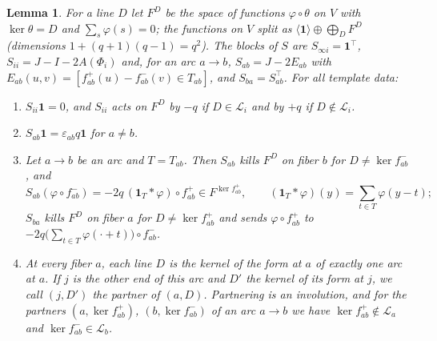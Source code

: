 \documentclass[11pt]{amsart}
\newtheorem{lemma}[theorem]{Lemma}
\theoremstyle{definition}
\theoremstyle{remark}
\newcommand{\one}{\mathbf 1}
\begin{document}
\begin{lemma}\label{lem:blocks}
For a line $D$ let $F^D$ be the space of functions $\varphi\circ\theta$ on $V$ with $\ker\theta=D$ and
$\sum_s\varphi(s)=0$; the functions on $V$ split as $\langle\one\rangle\oplus\bigoplus_DF^D$ (dimensions
$1+(q+1)(q-1)=q^2$). The blocks of $S$ are $S_{\infty i}=\one^\top$, $S_{ii}=J-I-2A(\Phi_i)$ and, for an arc $a\to b$,
$S_{ab}=J-2E_{ab}$ with $E_{ab}(u,v)=[f^+_{ab}(u)-f^-_{ab}(v)\in T_{ab}]$, and $S_{ba}=S_{ab}^\top$. For all template data:
\begin{enumerate}
\item[(F1)] $S_{ii}\one=0$, and $S_{ii}$ acts on $F^D$ by $-q$ if $D\in\mathcal L_i$ and by $+q$ if $D\notin\mathcal L_i$.
\item[(F2)] $S_{ab}\one=\varepsilon_{ab}q\one$ for $a\ne b$.
\item[(F3)] Let $a\to b$ be an arc and $T=T_{ab}$. Then $S_{ab}$ kills $F^D$ on fiber $b$ for $D\ne\ker f^-_{ab}$, and
\[S_{ab}(\varphi\circ f^-_{ab})=-2q\,(\one_T*\varphi)\circ f^+_{ab}\in F^{\ker f^+_{ab}},\qquad
(\one_T*\varphi)(y)=\sum_{t\in T}\varphi(y-t);\]
$S_{ba}$ kills $F^D$ on fiber $a$ for $D\ne\ker f^+_{ab}$ and sends $\varphi\circ f^+_{ab}$ to
$-2q\bigl(\sum_{t\in T}\varphi(\cdot+t)\bigr)\circ f^-_{ab}$.
\item[(F4)] At every fiber $a$, each line $D$ is the kernel of the form at $a$ of exactly one arc at $a$. If $j$ is the
other end of this arc and $D'$ the kernel of its form at $j$, we call $(j,D')$ the \emph{partner} of $(a,D)$.
Partnering is an involution, and for the partners $(a,\ker f^+_{ab})$, $(b,\ker f^-_{ab})$ of an arc $a\to b$ we have
$\ker f^+_{ab}\notin\mathcal L_a$ and $\ker f^-_{ab}\in\mathcal L_b$.
\end{enumerate}
\end{lemma}
\end{document}
